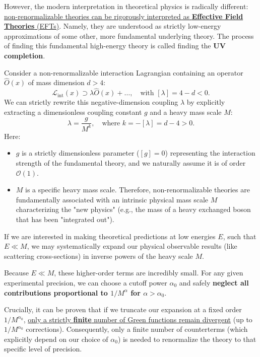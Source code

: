 However, the modern interpretation in theoretical physics is radically different: \uline{non-renormalizable theories can be rigorously interpreted as \textbf{Effective Field Theories} (EFTs)}. Namely, they are understood as strictly low-energy approximations of some other, more fundamental underlying theory. The process of finding this fundamental high-energy theory is called finding the \textbf{UV completion}.

Consider a non-renormalizable interaction Lagrangian containing an operator $\hat{O}(x)$ of mass dimension $d > 4$:
\[
    \mathcal{L}_{\text{int}}(x) \supset \lambda \hat{O}(x) + \dots, \quad \text{with } [\lambda] = 4 - d < 0.
\]
We can strictly rewrite this negative-dimension coupling $\lambda$ by explicitly extracting a dimensionless coupling constant $g$ and a heavy mass scale $M$:
\[
    \lambda = \frac{g}{M^k}, \quad \text{where } k = -[\lambda] = d - 4 > 0.
\]
Here:
\begin{itemize}
    \item $g$ is a strictly dimensionless parameter ($[g]=0$) representing the interaction strength of the fundamental theory, and we naturally assume it is of order $\mathcal{O}(1)$.
    \item $M$ is a specific heavy mass scale. Therefore, non-renormalizable theories are fundamentally associated with an intrinsic physical mass scale $M$ characterizing the "new physics" (e.g., the mass of a heavy exchanged boson that has been "integrated out").
\end{itemize}

If we are interested in making theoretical predictions at low energies $E$, such that $E \ll M$, we may systematically expand our physical observable results (like scattering cross-sections) in inverse powers of the heavy scale $M$.

Because $E \ll M$, these higher-order terms are incredibly small. For any given experimental precision, we can choose a cutoff power $\alpha_0$ and safely \textbf{neglect all contributions proportional to $1/M^\alpha$ for $\alpha > \alpha_0$}.

Crucially, it can be proven that if we truncate our expansion at a fixed order $1/M^{\alpha_0}$, \uline{only a strictly \textbf{finite} number of Green functions remain divergent} (up to $1/M^{\alpha_0}$ corrections). Consequently, only a finite number of counterterms (which explicitly depend on our choice of $\alpha_0$) is needed to renormalize the theory to that specific level of precision.

